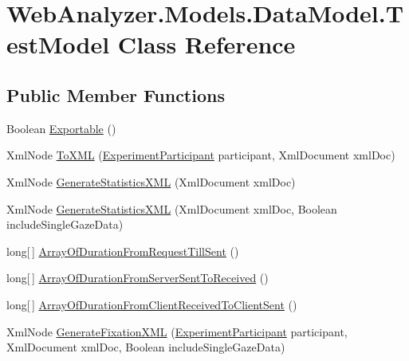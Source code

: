 \hypertarget{class_web_analyzer_1_1_models_1_1_data_model_1_1_test_model}{}\section{Web\+Analyzer.\+Models.\+Data\+Model.\+Test\+Model Class Reference}
\label{class_web_analyzer_1_1_models_1_1_data_model_1_1_test_model}
\subsection*{Public Member Functions}
\begin{DoxyCompactItemize}
\item 
Boolean \hyperlink{class_web_analyzer_1_1_models_1_1_data_model_1_1_test_model_af8e1e55844cdb5e707ed4a0942448867}{Exportable} ()
\item 
Xml\+Node \hyperlink{class_web_analyzer_1_1_models_1_1_data_model_1_1_test_model_a0320168b69827719088d63216b7cd07c}{To\+X\+M\+L} (\hyperlink{class_web_analyzer_1_1_models_1_1_base_1_1_experiment_participant}{Experiment\+Participant} participant, Xml\+Document xml\+Doc)
\item 
Xml\+Node \hyperlink{class_web_analyzer_1_1_models_1_1_data_model_1_1_test_model_a81c7aa756c48c0a577b9877ebbbb07b8}{Generate\+Statistics\+X\+M\+L} (Xml\+Document xml\+Doc)
\item 
Xml\+Node \hyperlink{class_web_analyzer_1_1_models_1_1_data_model_1_1_test_model_a59a7a3398a51963ffde94badae9bcc38}{Generate\+Statistics\+X\+M\+L} (Xml\+Document xml\+Doc, Boolean include\+Single\+Gaze\+Data)
\item 
long\mbox{[}$\,$\mbox{]} \hyperlink{class_web_analyzer_1_1_models_1_1_data_model_1_1_test_model_ad9e6b0da3998485b11af3f532c429136}{Array\+Of\+Duration\+From\+Request\+Till\+Sent} ()
\item 
long\mbox{[}$\,$\mbox{]} \hyperlink{class_web_analyzer_1_1_models_1_1_data_model_1_1_test_model_a6e300cf8b7c50571b1f99230d322fb78}{Array\+Of\+Duration\+From\+Server\+Sent\+To\+Received} ()
\item 
long\mbox{[}$\,$\mbox{]} \hyperlink{class_web_analyzer_1_1_models_1_1_data_model_1_1_test_model_a2f272e9970feb3a1fbca147b34b8b3f7}{Array\+Of\+Duration\+From\+Client\+Received\+To\+Client\+Sent} ()
\item 
Xml\+Node \hyperlink{class_web_analyzer_1_1_models_1_1_data_model_1_1_test_model_abc99e17d851571723952cf1717d0a711}{Generate\+Fixation\+X\+M\+L} (\hyperlink{class_web_analyzer_1_1_models_1_1_base_1_1_experiment_participant}{Experiment\+Participant} participant, Xml\+Document xml\+Doc, Boolean include\+Single\+Gaze\+Data)

\end{DoxyCompactItemize}
